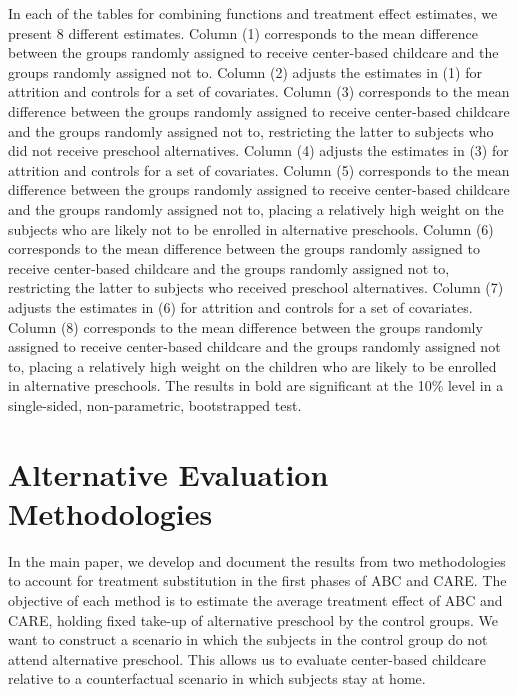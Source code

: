 \begin{appendices}
\noindent In each of the tables for combining functions and treatment effect estimates, we present 8 different estimates. Column (1) corresponds to the mean difference between the groups randomly assigned to receive center-based childcare and the groups randomly assigned not to. Column (2) adjusts the estimates in (1) for attrition and controls for a set of covariates. Column (3) corresponds to the mean difference between the groups randomly assigned to receive center-based childcare and the groups randomly assigned not to, restricting the latter to subjects who did not receive preschool alternatives. Column (4) adjusts the estimates in (3) for attrition and controls for a set of covariates. Column (5) corresponds to the mean difference between the groups randomly assigned to receive center-based childcare and the groups randomly assigned not to, placing a relatively high weight on the subjects who are likely not to be enrolled in alternative preschools. Column (6) corresponds to the mean difference between the groups randomly assigned to receive center-based childcare and the groups randomly assigned not to, restricting the latter to subjects who received preschool alternatives. Column (7) adjusts the estimates in (6) for attrition and controls for a set of covariates. Column (8) corresponds to the mean difference between the groups randomly assigned to receive center-based childcare and the groups randomly assigned not to, placing a relatively high weight on the children who are likely to be enrolled in alternative preschools. The results in bold are significant at the 10\% level in a single-sided, non-parametric, bootstrapped test. \\



\setcounter{figure}{0}  \renewcommand{\thefigure}{D.\arabic{figure}}
\setcounter{table}{0}   \renewcommand{\thetable}{D.\arabic{table}}
\section{Alternative Evaluation Methodologies} \label{appendix:amethodology}

\noindent In the main paper, we develop and document the results from two methodologies to account for treatment substitution in the first phases of ABC and CARE. The objective of each method is to estimate the average treatment effect of ABC and CARE, holding fixed take-up of alternative preschool by the control groups. We want to construct a scenario in which the subjects in the control group do not attend alternative preschool. This allows us to evaluate center-based childcare relative to a counterfactual scenario in which subjects stay at home.\\


\end{appendices}
